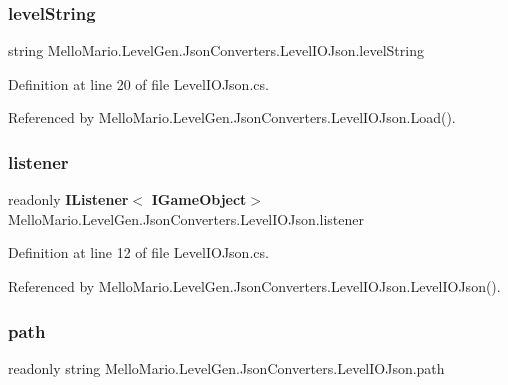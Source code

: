 \subsubsection{level\+String}
{\footnotesize\ttfamily string Mello\+Mario.\+Level\+Gen.\+Json\+Converters.\+Level\+I\+O\+Json.\+level\+String\hspace{0.3cm}{\ttfamily [private]}}



Definition at line 20 of file Level\+I\+O\+Json.\+cs.



Referenced by Mello\+Mario.\+Level\+Gen.\+Json\+Converters.\+Level\+I\+O\+Json.\+Load().

\mbox{\label{classMelloMario_1_1LevelGen_1_1JsonConverters_1_1LevelIOJson_a9f26f8e9b3107198c4a8e172c0b090ab}} 
\subsubsection{listener}
{\footnotesize\ttfamily readonly \textbf{ I\+Listener}$<$\textbf{ I\+Game\+Object}$>$ Mello\+Mario.\+Level\+Gen.\+Json\+Converters.\+Level\+I\+O\+Json.\+listener\hspace{0.3cm}{\ttfamily [private]}}



Definition at line 12 of file Level\+I\+O\+Json.\+cs.



Referenced by Mello\+Mario.\+Level\+Gen.\+Json\+Converters.\+Level\+I\+O\+Json.\+Level\+I\+O\+Json().

\mbox{\label{classMelloMario_1_1LevelGen_1_1JsonConverters_1_1LevelIOJson_ac72e47af95b59877eb053e9737913e73}} 
\subsubsection{path}
{\footnotesize\ttfamily readonly string Mello\+Mario.\+Level\+Gen.\+Json\+Converters.\+Level\+I\+O\+Json.\+path\hspace{0.3cm}{\ttfamily [private]}}



